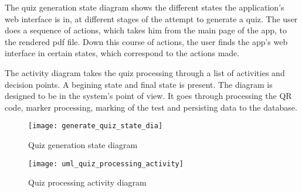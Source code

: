 The quiz generation state diagram shows the different states the application's web interface is in, at different stages of the attempt to generate a quiz. The user does a sequence of actions, which takes him from the main page of the app, to the rendered pdf file. Down this course of actions, the user finds the app's web interface in certain states, which correspond to the actions made.

The activity diagram takes the quiz processing through a list of activities and decision points. A begining state and final state is present. The diagram is designed to be in the system's point of view. It goes through processing the QR code, marker processing, marking of the test and persisting data to the database.

\begin{figure}[!ht]
\centering
\texttt{[image: generate\_quiz\_state\_dia]}
\caption{Quiz generation state diagram}\label{generation_state}
\end{figure}

\begin{figure}[!ht]
\centering
\texttt{[image: uml\_quiz\_processing\_activity]}
\caption{Quiz processing activity diagram}\label{processing_activity}
\end{figure}







